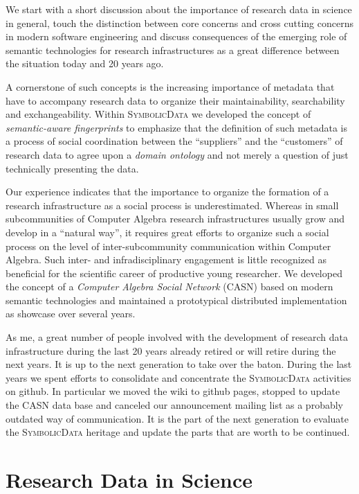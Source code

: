 \documentclass[a4paper,11pt]{article}
\def\SD{\textsc{SymbolicData}}
\begin{document}
We start with a short discussion about the importance of research data in
science in general, touch the distinction between core concerns and cross
cutting concerns in modern software engineering and discuss consequences of the
emerging role of semantic technologies for research infrastructures as a great
difference between the situation today and 20 years ago.

A cornerstone of such concepts is the increasing importance of metadata that
have to accompany research data to organize their maintainability,
searchability and exchangeability. Within {\SD} we developed the concept of
\emph{semantic-aware fingerprints} to emphasize that the definition of such
metadata is a process of social coordination between the ``suppliers'' and the
``customers'' of research data to agree upon a \emph{domain ontology} and not
merely a question of just technically presenting the data.

Our experience indicates that the importance to organize the formation of a
research infrastructure as a social process is underestimated.  Whereas in
small subcommunities of Computer Algebra research infrastructures usually grow
and develop in a ``natural way'', it requires great efforts to organize such a
social process on the level of inter-subcommunity communication within Computer
Algebra.  Such inter- and infradisciplinary engagement is little recognized as
beneficial for the scientific career of productive young researcher. We
developed the concept of a \emph{Computer Algebra Social Network} (CASN)
\cite{car-55} based on modern semantic technologies and maintained a
prototypical distributed implementation as showcase over several years.

As me, a great number of people involved with the development of research data
infrastructure during the last 20 years already retired or will retire during
the next years.  It is up to the next generation to take over the baton.
During the last years we spent efforts to consolidate and concentrate the {\SD}
activities on github. In particular we moved the wiki to github pages, stopped
to update the CASN data base and canceled our announcement mailing list as a
probably outdated way of communication.  It is the part of the next generation
to evaluate the {\SD} heritage and update the parts that are worth to be
continued.  

\section{Research Data in Science}
\end{document}
